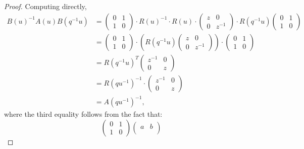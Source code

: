 \documentclass[a4paper]{report}
\theoremstyle{theorem}
\theoremstyle{definition}
\theoremstyle{remark}
\theoremstyle{proposition}
\theoremstyle{conjecture}
\theoremstyle{lemma}
\theoremstyle{corollary}
\theoremstyle{exercise}
\theoremstyle{example}
\begin{document}
  \begin{proof}
      Computing directly,
      \begin{align*}
          B(u)^{-1} A(u) B(q^{-1}u) &= \begin{pmatrix}
              0 & 1\\
              1 & 0
          \end{pmatrix} \cdot R(u)^{-1} \cdot R(u) \cdot \begin{pmatrix}
              z & 0 \\
              0 & z^{-1}
          \end{pmatrix} \cdot R(q^{-1}u) \begin{pmatrix}
              0 & 1\\ 
              1 & 0
          \end{pmatrix}\\ 
          &= \begin{pmatrix}
              0 & 1\\
              1 & 0
          \end{pmatrix} \cdot \left( R(q^{-1}u) \begin{pmatrix}
              z & 0\\ 
              0 & z^{-1}
          \end{pmatrix} \right) \cdot \begin{pmatrix}
              0 & 1\\
              1 & 0
          \end{pmatrix}\\
          &= R(q^{-1}u)^T \begin{pmatrix}
              z^{-1} & 0\\ 
              0 & z
          \end{pmatrix}\\ 
          &= R(qu^{-1})^{-1} \cdot \begin{pmatrix}
              z^{-1} & 0\\
              0 & z
          \end{pmatrix}\\
          &= A(qu^{-1})^{-1},
      \end{align*}
      where the third equality follows from the fact that:
      $$\begin{pmatrix}
          0 & 1\\
          1 & 0
      \end{pmatrix}\begin{pmatrix}
          a & b\\

\end{pmatrix}$$
\end{proof}
\end{document}
